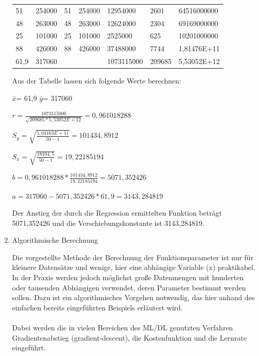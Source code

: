 \begin{enumerate}
\begin{table}
\begin{tabular}{lllllll}
51                    & 254000                 & 51                  & 254000              & 12954000                                    & 2601                    & 64516000000             \\
48                    & 263000                 & 48                  & 263000              & 12624000                                    & 2304                    & 69169000000             \\
25                    & 101000                 & 25                  & 101000              & 2525000                                     & 625                     & 10201000000             \\
88                    & 426000                 & 88                  & 426000              & 37488000                                    & 7744                    & 1,81476E+11             \\
61,9                  & 317060                 &                     &                     & 1073115000                                  & 209685                  & 5,53052E+12            
\end{tabular}
\end{table}

Aus der Tabelle lassen sich folgende Werte berechnen:

$\bar{x}$= 61,9
$\bar{y}$= 317060 

$r= \frac{1073115000}{\sqrt{209685*5,53052E+12}}=0,961018288$

$S_{y}= \sqrt{\frac{5,04163 E+11}{50-1}}=101434,8912$

$S_{x}= \sqrt{\frac{18104,5}{50-1}}=19,22185194$

$b= 0,961018288*\frac{101434,8912}{19,22185194}=5071,352426$
 
$a=317060-5071,352426*61,9=3143,284819$

Der Anstieg der durch die Regression ermittelten Funktion beträgt 5071,352426 und die Verschiebungskonstante ist 3143,284819.


\item Algorithmische Berechnung

Die vorgestellte Methode der Berechnung der Funktionsparameter ist nur für kleinere Datensätze und wenige, hier eine abhängige Variable (x) praktikabel. In der Praxis werden jedoch möglichst große Datenmengen mit hunderten oder tausenden Abhängigen verwendet, deren Parameter bestimmt werden sollen. Dazu ist ein algorithmisches Vorgehen notwendig, das hier anhand des einfachen bereits eingeführten Beispiels erläutert wird.\\\\
Dabei werden die in vielen Bereichen des ML/DL genutzten Verfahren Gradientenabstieg (gradient-descent), die Kostenfunktion und die Lernrate eingeführt. 


\end{enumerate}
